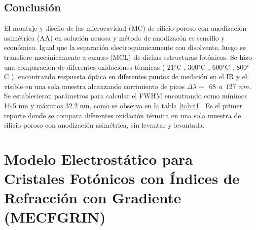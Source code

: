\documentclass[a4paper,11pt,]{book}
\newcommand{\grad}{$^{\circ}$}
\begin{document}
\section{Conclusión}
El montaje y diseño de las microcavidad (MC) de silicio poroso con anodización asimétrica (AA) en solución acuosa y método de anodizacón es sencillo y económico. Igual que la  separación  electroquimicamente con disolvente, luego se transfiere mecánicamente a cuarzo (MCL) de dichas estructuras fotónicas. Se hizo una comparación de diferentes oxidaciones térmicas ( 21\grad C ,  300\grad C ,  600\grad C ,  800\grad C ),  encontrando  respuesta óptica en diferentes puntos de medición en el IR y el visible en una sola muestra alcanzando corrimiento de picos  $\Delta \lambda \sim \ \ 68 \ \ a \ \ 127 \ \ nm $. Se establecieron parámetros para calcular el FWHM encontrando como mínimos 16.5 nm y máximos 32.2 nm, como se observa en la tabla \ref{tab:t1}.  Es el primer reporte donde se compara diferentes  oxidación térmica en una sola  muestra de silicio poroso  con anodización asimétrica, sin levantar y levantada. 


\chapter{Modelo Electrostático para Cristales Fotónicos con Índices de Refracción con Gradiente (MECFGRIN) }
\label{Mo:MECFGRIN}
\end{document}
